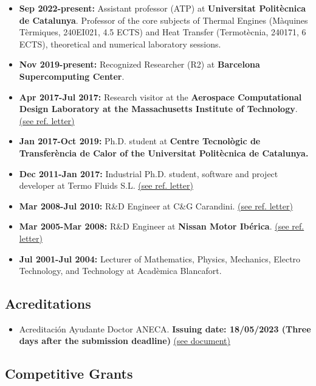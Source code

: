 \documentclass{article}
\begin{document}
\begin{itemize}
\item {\bf Sep 2022-present:} Assistant professor (ATP) at {\bf Universitat Politècnica de Catalunya}. Professor of the core subjects of Thermal Engines  (Màquines Tèrmiques, 240EI021, 4.5 ECTS) and Heat Transfer (Termotècnia, 240171, 6 ECTS), theoretical and numerical laboratory sessions.

\item {\bf Nov 2019-present:} Recognized Researcher (R2) at {\bf Barcelona Supercomputing Center}. 

\item  {\bf Apr 2017-Jul 2017:} Research visitor at the {\bf Aerospace Computational Design Laboratory at the Massachusetts Institute of Technology}. \hyperlink{mit.1}{(see ref. letter)}

\item {\bf Jan 2017-Oct 2019:} Ph.D. student at {\bf Centre Tecnològic de Transferència de Calor of the Universitat Politècnica de Catalunya.} 

\item  {\bf Dec 2011-Jan 2017:} Industrial Ph.D. student, software and project developer at Termo Fluids S.L. \hyperlink{termofluids.1}{(see ref. letter)}

\item  {\bf Mar 2008-Jul 2010:} R\&D Engineer at C\&G Carandini. \hyperlink{carandini.1}{(see ref. letter)}

\item  {\bf Mar 2005-Mar 2008:} R\&D Engineer at {\bf Nissan Motor Ibérica}. \hyperlink{nissan.1}{(see ref. letter)}

\item  {\bf Jul 2001-Jul 2004:} Lecturer of Mathematics, Physics, Mechanics, Electro Technology, and Technology at Acadèmica Blancafort. 

\end{itemize}


\subsection{Acreditations}
\begin{itemize}
\item Acreditación Ayudante Doctor ANECA. {\bf Issuing date: 18/05/2023 (Three days after the submission deadline)} \hyperlink{acreditacio.1}{(see document)}
\end{itemize}

\subsection{Competitive Grants}
\end{document}
